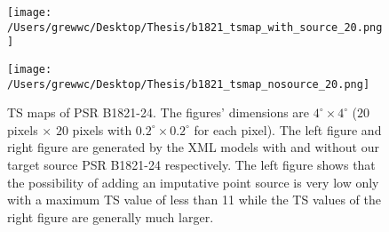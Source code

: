 \documentclass[12pt]{report}
\newcommand{\mycaption}[1]{\protect \caption{#1}}
\begin{document}
            \begin{figure}[!ht]
              \begin{center}
              \begin{minipage}{0.46\textwidth}
                \begin{center} 
                  \texttt{[image: /Users/grewwc/Desktop/Thesis/b1821\_tsmap\_with\_source\_20.png]}
                \end{center}
              \end{minipage}
              \begin{minipage}{0.45\textwidth}
                \begin{center}
                  \texttt{[image: /Users/grewwc/Desktop/Thesis/b1821\_tsmap\_nosource\_20.png]}
                \end{center}
              \end{minipage}
            \end{center}
            
            \mycaption{TS maps of PSR B1821-24. The figures' dimensions are $4^{\circ} \times4^{\circ}$ 
            ($20$ pixels $\times$ $20$ pixels with $0.2^{\circ} \times 0.2^{\circ}$ for each pixel). 
            The \textsf{left} figure and \textsf{right} figure are generated by the XML models with and without our 
            target source PSR B1821-24 respectively. The \textsf{left} figure shows that the possibility 
            of adding an imputative point source is very low only with a maximum TS value of 
            less than 11 while the TS values of the \textsf{right} figure are generally much larger.}
              \label{fig: b1821_tsmap_comparison_20}
            \end{figure}
            \vspace{1cm}
\end{document}
